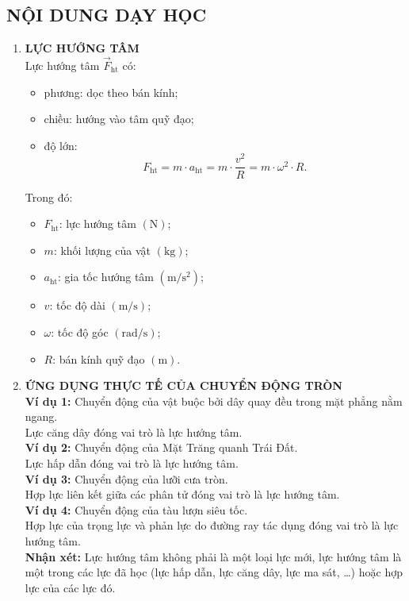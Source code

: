 \subsection{NỘI DUNG DẠY HỌC}
\begin{enumerate}[label=\bfseries\Roman*.]
	\item \textbf{LỰC HƯỚNG TÂM}\\
	Lực hướng tâm $\vec{F}_{\mathrm{ht}}$ có:
	\begin{itemize}
		\item phương: dọc theo bán kính;
		\item chiều: hướng vào tâm quỹ đạo;
		\item độ lớn:
		$$F_{\mathrm{ht}}=m\cdot a_{\mathrm{ht}}=m\cdot\dfrac{v^2}{R}=m\cdot\omega^2\cdot R.$$
	\end{itemize}
	Trong đó:
	\begin{itemize}
		\item $F_{\mathrm{ht}}$: lực hướng tâm $\left(\si{\newton}\right)$;
		\item $m$: khối lượng của vật $\left(\si{\kilogram}\right)$;
		\item $a_{\mathrm{ht}}$: gia tốc hướng tâm $\left(\si{\meter/\second^2}\right)$;
		\item $v$: tốc độ dài $\left(\si{\meter/\second}\right)$;
		\item $\omega$: tốc độ góc $\left(\si{\radian/\second}\right)$;
		\item $R$: bán kính quỹ đạo $\left(\si{\meter}\right)$.
	\end{itemize}
	\item \textbf{ỨNG DỤNG THỰC TẾ CỦA CHUYỂN ĐỘNG TRÒN}\\
	\textbf{Ví dụ 1:} Chuyển động của vật buộc bởi dây quay đều trong mặt phẳng nằm ngang.\\
	Lực căng dây đóng vai trò là lực hướng tâm.\\
	\textbf{Ví dụ 2:} Chuyển động của Mặt Trăng quanh Trái Đất.\\
	Lực hấp dẫn đóng vai trò là lực hướng tâm.\\
	\textbf{Ví dụ 3:} Chuyển động của lưỡi cưa tròn.\\
 Hợp lực liên kết giữa các phân tử đóng vai trò là lực hướng tâm.\\
 \textbf{Ví dụ 4:} Chuyển động của tàu lượn siêu tốc.\\
 Hợp lực của trọng lực và phản lực do đường ray tác dụng đóng vai trò là lực hướng tâm.\\
 \textbf{Nhận xét:} Lực hướng tâm không phải là một loại lực mới, lực hướng tâm là một trong các lực đã học (lực hấp dẫn, lực căng dây, lực ma sát, \dots) hoặc hợp lực của các lực đó.
\end{enumerate}
